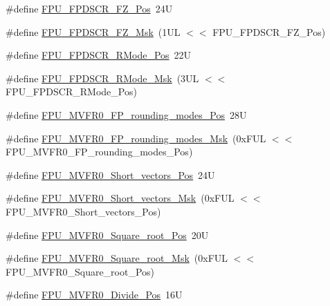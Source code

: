 \begin{DoxyCompactItemize}
\item 
\#define \mbox{\hyperlink{group___c_m_s_i_s___f_p_u_gab3c2fc96e312ba47b902d5f80d9b8575}{F\+P\+U\+\_\+\+F\+P\+D\+S\+C\+R\+\_\+\+F\+Z\+\_\+\+Pos}}~24U
\item 
\#define \mbox{\hyperlink{group___c_m_s_i_s___f_p_u_gaae7d901442d4af97c6d22939cffc8ad9}{F\+P\+U\+\_\+\+F\+P\+D\+S\+C\+R\+\_\+\+F\+Z\+\_\+\+Msk}}~(1\+U\+L $<$$<$ F\+P\+U\+\_\+\+F\+P\+D\+S\+C\+R\+\_\+\+F\+Z\+\_\+\+Pos)
\item 
\#define \mbox{\hyperlink{group___c_m_s_i_s___f_p_u_ga7aeedf36be8f170dd3e276028e8e29ed}{F\+P\+U\+\_\+\+F\+P\+D\+S\+C\+R\+\_\+\+R\+Mode\+\_\+\+Pos}}~22U
\item 
\#define \mbox{\hyperlink{group___c_m_s_i_s___f_p_u_ga449beb50211f8e97df6b2640c82c4741}{F\+P\+U\+\_\+\+F\+P\+D\+S\+C\+R\+\_\+\+R\+Mode\+\_\+\+Msk}}~(3\+U\+L $<$$<$ F\+P\+U\+\_\+\+F\+P\+D\+S\+C\+R\+\_\+\+R\+Mode\+\_\+\+Pos)
\item 
\#define \mbox{\hyperlink{group___c_m_s_i_s___f_p_u_ga1ebcc9076f08013f0ea814540df03e82}{F\+P\+U\+\_\+\+M\+V\+F\+R0\+\_\+\+F\+P\+\_\+rounding\+\_\+modes\+\_\+\+Pos}}~28U
\item 
\#define \mbox{\hyperlink{group___c_m_s_i_s___f_p_u_gae6dc9339ac72227d5d54360bb9fbef1b}{F\+P\+U\+\_\+\+M\+V\+F\+R0\+\_\+\+F\+P\+\_\+rounding\+\_\+modes\+\_\+\+Msk}}~(0x\+F\+U\+L $<$$<$ F\+P\+U\+\_\+\+M\+V\+F\+R0\+\_\+\+F\+P\+\_\+rounding\+\_\+modes\+\_\+\+Pos)
\item 
\#define \mbox{\hyperlink{group___c_m_s_i_s___f_p_u_gabbf83a918536ebf10889cee71a0404c7}{F\+P\+U\+\_\+\+M\+V\+F\+R0\+\_\+\+Short\+\_\+vectors\+\_\+\+Pos}}~24U
\item 
\#define \mbox{\hyperlink{group___c_m_s_i_s___f_p_u_gabf261a72023fdfc64f32c6b21d55c5b9}{F\+P\+U\+\_\+\+M\+V\+F\+R0\+\_\+\+Short\+\_\+vectors\+\_\+\+Msk}}~(0x\+F\+U\+L $<$$<$ F\+P\+U\+\_\+\+M\+V\+F\+R0\+\_\+\+Short\+\_\+vectors\+\_\+\+Pos)
\item 
\#define \mbox{\hyperlink{group___c_m_s_i_s___f_p_u_ga176c85453ba03257bf263adec05f7344}{F\+P\+U\+\_\+\+M\+V\+F\+R0\+\_\+\+Square\+\_\+root\+\_\+\+Pos}}~20U
\item 
\#define \mbox{\hyperlink{group___c_m_s_i_s___f_p_u_ga3ec0bfec1640bdaf9dff027f275b446d}{F\+P\+U\+\_\+\+M\+V\+F\+R0\+\_\+\+Square\+\_\+root\+\_\+\+Msk}}~(0x\+F\+U\+L $<$$<$ F\+P\+U\+\_\+\+M\+V\+F\+R0\+\_\+\+Square\+\_\+root\+\_\+\+Pos)
\item 
\#define \mbox{\hyperlink{group___c_m_s_i_s___f_p_u_ga167be203091e6cc7d00ad40ca48c4396}{F\+P\+U\+\_\+\+M\+V\+F\+R0\+\_\+\+Divide\+\_\+\+Pos}}~16U
$$
\end{DoxyCompactItemize}
